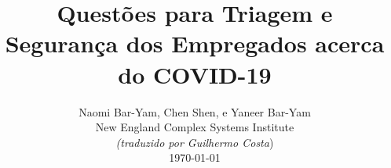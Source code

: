 \documentclass[onecolumn,journal]{IEEEtran}
\begin{document}
\title{\color{Brown} Questões para Triagem e Segurança dos Empregados acerca do COVID-19 \\
\vspace{-0.35ex}}
\author{Naomi Bar-Yam, Chen Shen, e Yaneer Bar-Yam \\ New England Complex Systems Institute \\
\vspace{+0.35ex}
\small{\textit{(traduzido por Guilhermo Costa})}\\
 \today
  \vspace{-14ex} \\


\bigskip
\bigskip

\textbf{}
 }

\maketitle


\flushbottom %



\thispagestyle{empty} %




\renewcommand{\thefootnote}{\fnsymbol{footnote}}
\end{document}
